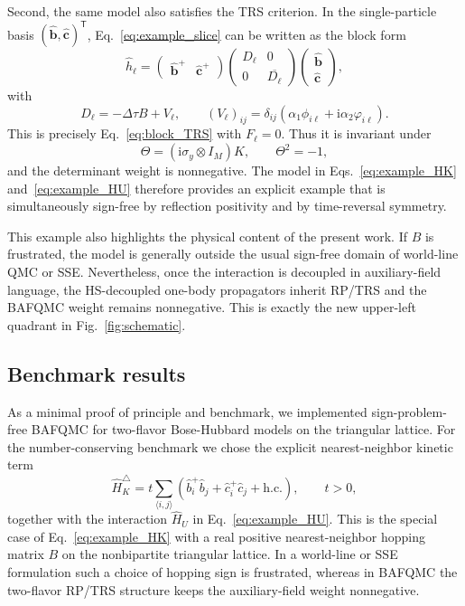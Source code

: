 \documentclass[twocolumn,aps,prb,10pt,amsmath,amssymb,amsthm,superscriptaddress]{revtex4-2}
\newcommand{\ii}{\mathrm{i}}
\newcommand{\trans}{\mathsf{T}}
\newcommand{\bb}[1]{\bm{#1}}
\theoremstyle{remark}
\begin{document}
Second, the same model also satisfies the TRS criterion. In the single-particle basis $(\hat{\bb b},\hat{\bb c})^\trans$, Eq.~\eqref{eq:example_slice} can be written as the block form
\begin{equation}
    \hat h_\ell =
    \begin{pmatrix}
        \hat{\bb b}^+ & \hat{\bb c}^+
    \end{pmatrix}
    \begin{pmatrix}
        D_\ell & 0 \\
        0 & \overline{D_\ell}
    \end{pmatrix}
    \begin{pmatrix}
        \hat{\bb b} \\ \hat{\bb c}
    \end{pmatrix},
\end{equation}
with
\begin{equation}
    D_\ell = -\Delta\tau B + V_\ell,
    \qquad
    (V_\ell)_{ij}=\delta_{ij}\left(\alpha_1\phi_{i\ell}+\ii\alpha_2\varphi_{i\ell}\right).
\end{equation}
This is precisely Eq.~\eqref{eq:block_TRS} with $F_\ell=0$. Thus it is invariant under
\begin{equation}
    \Theta = (\ii\sigma_y\otimes I_M)K,
    \qquad
    \Theta^2=-1,
\end{equation}
and the determinant weight is nonnegative. The model in Eqs.~\eqref{eq:example_HK} and~\eqref{eq:example_HU} therefore provides an explicit example that is simultaneously sign-free by reflection positivity and by time-reversal symmetry.

This example also highlights the physical content of the present work. If $B$ is frustrated, the model is generally outside the usual sign-free domain of world-line QMC or SSE. Nevertheless, once the interaction is decoupled in auxiliary-field language, the HS-decoupled one-body propagators inherit RP/TRS and the BAFQMC weight remains nonnegative. This is exactly the new upper-left quadrant in Fig.~\ref{fig:schematic}.

\subsection{Benchmark results}
\label{sec:benchmark}

As a minimal proof of principle and benchmark, we implemented sign-problem-free BAFQMC for two-flavor Bose-Hubbard models on the triangular lattice. For the number-conserving benchmark we chose the explicit nearest-neighbor kinetic term
\begin{equation}
    \hat H_{K}^{\triangle} = t \sum_{\langle i,j\rangle} \left(\hat b_i^+\hat b_j + \hat c_i^+\hat c_j + \mathrm{h.c.}\right),
    \qquad t>0,
    \label{eq:benchmark_HK}
\end{equation}
together with the interaction $\hat H_U$ in Eq.~\eqref{eq:example_HU}. This is the special case of Eq.~\eqref{eq:example_HK} with a real positive nearest-neighbor hopping matrix $B$ on the nonbipartite triangular lattice. In a world-line or SSE formulation such a choice of hopping sign is frustrated, whereas in BAFQMC the two-flavor RP/TRS structure keeps the auxiliary-field weight nonnegative.
\end{document}

